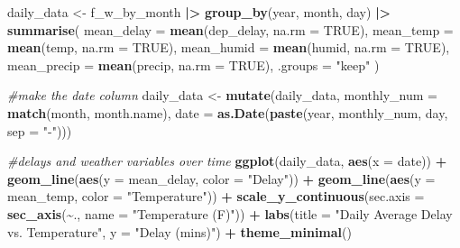 \documentclass[
]{article}
\newenvironment{Shaded}{\begin{snugshade}}{\end{snugshade}}
\newcommand{\AttributeTok}[1]{\textcolor[rgb]{0.13,0.29,0.53}{#1}}
\newcommand{\CommentTok}[1]{\textcolor[rgb]{0.56,0.35,0.01}{\textit{#1}}}
\newcommand{\ConstantTok}[1]{\textcolor[rgb]{0.56,0.35,0.01}{#1}}
\newcommand{\FunctionTok}[1]{\textcolor[rgb]{0.13,0.29,0.53}{\textbf{#1}}}
\newcommand{\NormalTok}[1]{#1}
\newcommand{\OtherTok}[1]{\textcolor[rgb]{0.56,0.35,0.01}{#1}}
\newcommand{\SpecialCharTok}[1]{\textcolor[rgb]{0.81,0.36,0.00}{\textbf{#1}}}
\newcommand{\StringTok}[1]{\textcolor[rgb]{0.31,0.60,0.02}{#1}}
\begin{document}
\begin{Shaded}
\begin{Highlighting}[]
\NormalTok{daily\_data }\OtherTok{\textless{}{-}}\NormalTok{ f\_w\_by\_month }\SpecialCharTok{|\textgreater{}}
  \FunctionTok{group\_by}\NormalTok{(year, month, day) }\SpecialCharTok{|\textgreater{}}
  \FunctionTok{summarise}\NormalTok{(}
    \AttributeTok{mean\_delay =} \FunctionTok{mean}\NormalTok{(dep\_delay, }\AttributeTok{na.rm =} \ConstantTok{TRUE}\NormalTok{),}
    \AttributeTok{mean\_temp =} \FunctionTok{mean}\NormalTok{(temp, }\AttributeTok{na.rm =} \ConstantTok{TRUE}\NormalTok{),}
    \AttributeTok{mean\_humid =} \FunctionTok{mean}\NormalTok{(humid, }\AttributeTok{na.rm =} \ConstantTok{TRUE}\NormalTok{),}
    \AttributeTok{mean\_precip =} \FunctionTok{mean}\NormalTok{(precip, }\AttributeTok{na.rm =} \ConstantTok{TRUE}\NormalTok{),}
    \AttributeTok{.groups =} \StringTok{"keep"}
\NormalTok{  )}

\CommentTok{\#make the date column }
\NormalTok{daily\_data }\OtherTok{\textless{}{-}} \FunctionTok{mutate}\NormalTok{(daily\_data, }
                     \AttributeTok{monthly\_num =} \FunctionTok{match}\NormalTok{(month, month.name),}
                     \AttributeTok{date =} \FunctionTok{as.Date}\NormalTok{(}\FunctionTok{paste}\NormalTok{(year, monthly\_num, day, }\AttributeTok{sep =} \StringTok{"{-}"}\NormalTok{)))}

\CommentTok{\#delays and weather variables over time}
\FunctionTok{ggplot}\NormalTok{(daily\_data, }\FunctionTok{aes}\NormalTok{(}\AttributeTok{x =}\NormalTok{ date)) }\SpecialCharTok{+}
  \FunctionTok{geom\_line}\NormalTok{(}\FunctionTok{aes}\NormalTok{(}\AttributeTok{y =}\NormalTok{ mean\_delay, }\AttributeTok{color =} \StringTok{"Delay"}\NormalTok{)) }\SpecialCharTok{+}
  \FunctionTok{geom\_line}\NormalTok{(}\FunctionTok{aes}\NormalTok{(}\AttributeTok{y =}\NormalTok{ mean\_temp, }\AttributeTok{color =} \StringTok{"Temperature"}\NormalTok{)) }\SpecialCharTok{+}
  \FunctionTok{scale\_y\_continuous}\NormalTok{(}\AttributeTok{sec.axis =} \FunctionTok{sec\_axis}\NormalTok{(}\SpecialCharTok{\textasciitilde{}}\NormalTok{., }\AttributeTok{name =} \StringTok{"Temperature (F)"}\NormalTok{)) }\SpecialCharTok{+}
  \FunctionTok{labs}\NormalTok{(}\AttributeTok{title =} \StringTok{"Daily Average Delay vs. Temperature"}\NormalTok{, }\AttributeTok{y =} \StringTok{"Delay (mins)"}\NormalTok{) }\SpecialCharTok{+}
  \FunctionTok{theme\_minimal}\NormalTok{()}
\end{Highlighting}
\end{Shaded}
\end{document}
